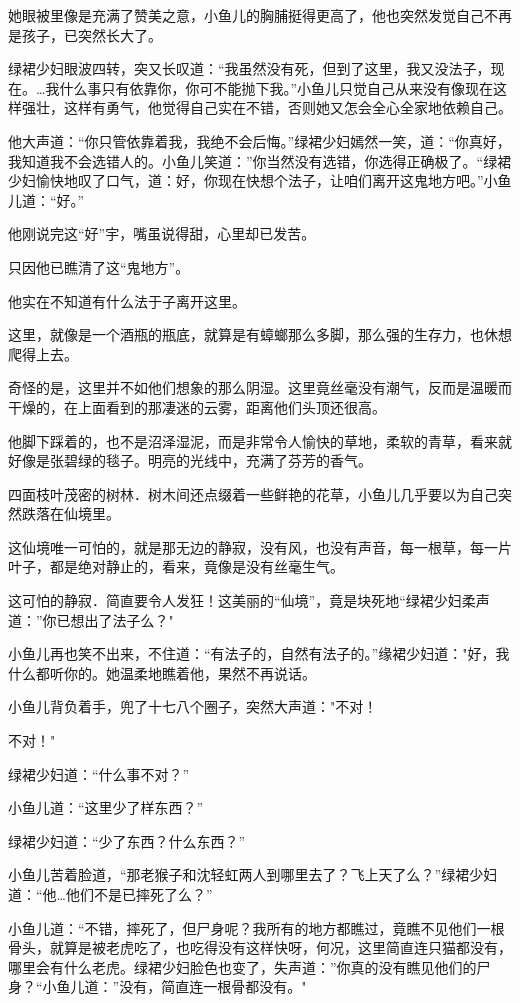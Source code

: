 \documentclass[12pt,oneside]{book}
\begin{document}
她眼被里像是充满了赞美之意，小鱼儿的胸脯挺得更高了，他也突然发觉自己不再是孩子，已突然长大了。

绿裙少妇眼波四转，突又长叹道：``我虽然没有死，但到了这里，我又没法子，现在。\ldots 我什么事只有依靠你，你可不能抛下我。''小鱼儿只觉自己从来没有像现在这样强壮，这样有勇气，他觉得自己实在不错，否则她又怎会全心全家地依赖自己。

他大声道：``你只管依靠着我，我绝不会后悔。''绿裙少妇嫣然一笑，道：``你真好，我知道我不会选错人的。小鱼儿笑道：''你当然没有选错，你选得正确极了。``绿裙少妇愉快地叹了口气，道：好，你现在快想个法子，让咱们离开这鬼地方吧。''小鱼儿道：``好。''

他刚说完这``好''宇，嘴虽说得甜，心里却已发苦。

只因他已瞧清了这``鬼地方''。

他实在不知道有什么法于子离开这里。

这里，就像是一个酒瓶的瓶底，就算是有蟑螂那么多脚，那么强的生存力，也休想爬得上去。

奇怪的是，这里并不如他们想象的那么阴湿。这里竟丝毫没有潮气，反而是温暖而干燥的，在上面看到的那凄迷的云雾，距离他们头顶还很高。

他脚下踩着的，也不是沼泽湿泥，而是非常令人愉快的草地，柔软的青草，看来就好像是张碧绿的毯子。明亮的光线中，充满了芬芳的香气。

四面枝叶茂密的树林．树木间还点缀着一些鲜艳的花草，小鱼儿几乎要以为自己突然跌落在仙境里。

这仙境唯一可怕的，就是那无边的静寂，没有风，也没有声音，每一根草，每一片叶子，都是绝对静止的，看来，竟像是没有丝毫生气。

这可怕的静寂．简直要令人发狂！这美丽的``仙境''，竟是块死地``绿裙少妇柔声道：''你已想出了法子么？"

小鱼儿再也笑不出来，不住道：``有法子的，自然有法子的。''缘裙少妇道："好，我什么都听你的。她温柔地瞧着他，果然不再说话。

小鱼儿背负着手，兜了十七八个圈子，突然大声道："不对！

不对！"

绿裙少妇道：``什么事不对？''

小鱼儿道：``这里少了样东西？''

绿裙少妇道：``少了东西？什么东西？''

小鱼儿苦着脸道，``那老猴子和沈轻虹两人到哪里去了？飞上天了么？''绿裙少妇道：``他\ldots 他们不是已摔死了么？''

小鱼儿道：``不错，摔死了，但尸身呢？我所有的地方都瞧过，竟瞧不见他们一根骨头，就算是被老虎吃了，也吃得没有这样快呀，何况，这里简直连只猫都没有，哪里会有什么老虎。绿裙少妇脸色也变了，失声道：''你真的没有瞧见他们的尸身？``小鱼儿道：''没有，简直连一根骨都没有。"
\end{document}
